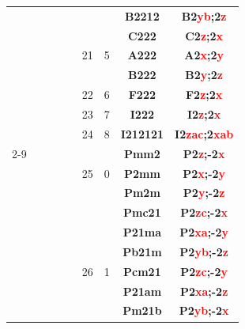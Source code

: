 \documentclass{article}      %
\begin{document}
\begin{small}
\begin{longtable}[c]{|c|c|c|c|c|c|c|c|c|}
 & & & & & & &\textbf{B2212} &\textbf{B2\textcolor{red}{yb};2\textcolor{red}{z}}  \\\cline{6-9}
 & & & & & & &\textbf{C222} &\textbf{C2\textcolor{red}{z};2\textcolor{red}{x}}  \\\cline{8-9}
 & & & & &\textrm{21} &5 &\textbf{A222} &\textbf{A2\textcolor{red}{x};2\textcolor{red}{y}}  \\\cline{8-9}
 & & & & & & &\textbf{B222} &\textbf{B2\textcolor{red}{y};2\textcolor{red}{z}}  \\\cline{6-9}
 & & & & &\textrm{22} &6 &\textbf{F222} &\textbf{F2\textcolor{red}{z};2\textcolor{red}{x}}  \\\cline{6-9}
 & & & & &\textrm{23} &7 &\textbf{I222} &\textbf{I2\textcolor{red}{z};2\textcolor{red}{x}}  \\\cline{6-9}
 & & & & &\textrm{24} &8 &\textbf{I212121} &\textbf{I2\textcolor{red}{zac};2\textcolor{red}{xab}}  \\\cline{
 2-9}
          &  & & & &  & &\textbf{Pmm2}         &\textbf{P2\textcolor{red}{z};-2\textcolor{red}{x}}\\\cline{8-9}           
	  &  & & & &\textrm{25}  &\textrm{0} &\textbf{P2mm}         &\textbf{P2\textcolor{red}{x};-2\textcolor{red}{y}}\\\cline{8-9}           
          &  & & & &  & &\textbf{Pm2m}         &\textbf{P2\textcolor{red}{y};-2\textcolor{red}{z}}\\\cline{6-9}           
          &  & & & &  & &\textbf{Pmc21}       &\textbf{P2\textcolor{red}{zc};-2\textcolor{red}{x}}\\\cline{8-9}          
          &  & & & &  & &\textbf{P21ma}       &\textbf{P2\textcolor{red}{xa};-2\textcolor{red}{y}}\\\cline{8-9}          
          &  & & & &  & &\textbf{Pb21m}       &\textbf{P2\textcolor{red}{yb};-2\textcolor{red}{z}}\\\cline{8-9}          
	  &  & & & &\textrm{26}  &\textrm{1} &\textbf{Pcm21}       &\textbf{P2\textcolor{red}{zc};-2\textcolor{red}{y}}\\\cline{8-9}          
          &  & & & &  & &\textbf{P21am}       &\textbf{P2\textcolor{red}{xa};-2\textcolor{red}{z}}\\\cline{8-9}        
          &  & & & &  & &\textbf{Pm21b}       &\textbf{P2\textcolor{red}{yb};-2\textcolor{red}{x}}\\\cline{6-9}          

\end{longtable}
\end{small}
\end{document}
